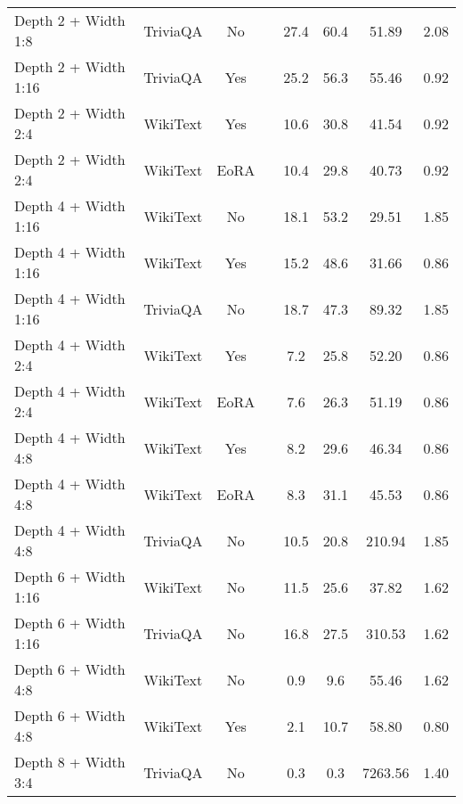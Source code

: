 {\begin{table}[htbp]
\begin{tabular}{lcclcccc}
Depth 2 + Width 1:8 & TriviaQA & No & & 27.4 & 60.4 & 51.89 & 2.08 \\
Depth 2 + Width 1:16 & TriviaQA & Yes & & 25.2 & 56.3 & 55.46 & 0.92 \\
Depth 2 + Width 2:4 & WikiText & Yes & & 10.6 & 30.8 & 41.54 & 0.92 \\
Depth 2 + Width 2:4 & WikiText & EoRA & & 10.4 & 29.8 & 40.73 & 0.92 \\
Depth 4 + Width 1:16 & WikiText & No & & 18.1 & 53.2 & 29.51 & 1.85 \\
Depth 4 + Width 1:16 & WikiText & Yes & & 15.2 & 48.6 & 31.66 & 0.86 \\
Depth 4 + Width 1:16 & TriviaQA & No & & 18.7 & 47.3 & 89.32 & 1.85 \\
Depth 4 + Width 2:4 & WikiText & Yes & & 7.2 & 25.8 & 52.20 & 0.86 \\
Depth 4 + Width 2:4 & WikiText & EoRA & & 7.6 & 26.3 & 51.19 & 0.86 \\
Depth 4 + Width 4:8 & WikiText & Yes & & 8.2 & 29.6 & 46.34 & 0.86 \\
Depth 4 + Width 4:8 & WikiText & EoRA & & 8.3 & 31.1 & 45.53 & 0.86 \\
Depth 4 + Width 4:8 & TriviaQA & No & & 10.5 & 20.8 & 210.94 & 1.85 \\
Depth 6 + Width 1:16 & WikiText & No & & 11.5 & 25.6 & 37.82 & 1.62 \\
Depth 6 + Width 1:16 & TriviaQA & No & & 16.8 & 27.5 & 310.53 & 1.62 \\
Depth 6 + Width 4:8 & WikiText & No & & 0.9 & 9.6 & 55.46 & 1.62 \\
Depth 6 + Width 4:8 & WikiText & Yes & & 2.1 & 10.7 & 58.80 & 0.80 \\
Depth 8 + Width 3:4 & TriviaQA & No & & 0.3 & 0.3 & 7263.56 & 1.40 \\
\hline
\end{tabular}
\end{table}
}


